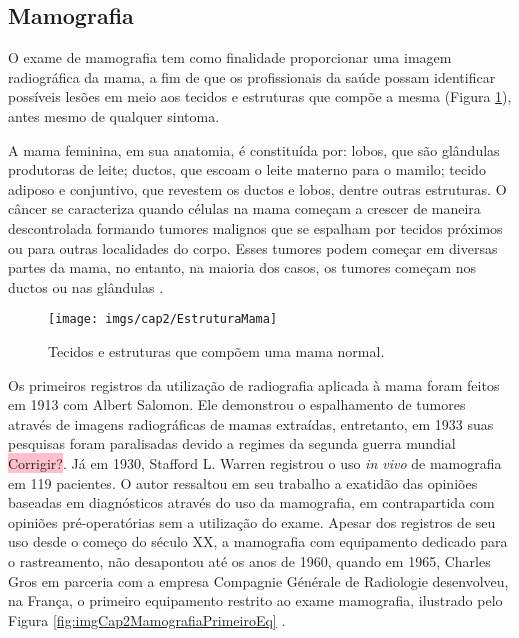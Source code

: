 \subsection{Mamografia}

O exame de mamografia tem como finalidade proporcionar uma imagem radiográfica da mama, a fim de que os profissionais da saúde possam identificar possíveis lesões em meio aos tecidos e estruturas que compõe a mesma (Figura \ref{fig:imgCap2EstruturaMama}), antes mesmo de qualquer sintoma. 

A mama feminina, em sua anatomia, é constituída por: lobos, que são glândulas produtoras de leite; ductos, que escoam o leite materno para o mamilo; tecido adiposo e conjuntivo, que revestem os ductos e lobos, dentre outras estruturas. O câncer se caracteriza quando células na mama começam a crescer de maneira descontrolada formando tumores malignos que se espalham por tecidos próximos ou para outras localidades do corpo. Esses tumores podem começar em diversas partes da mama, no entanto, na maioria dos casos, os tumores começam nos ductos ou nas glândulas \cite{americancancersociety2017}.      

\begin{figure}[H]
	\caption{Tecidos e estruturas que compõem uma mama normal.}
	\begin{center}
		\texttt{[image: imgs/cap2/EstruturaMama]}
	\end{center}
	\label{fig:imgCap2EstruturaMama}
\end{figure}

Os primeiros registros da utilização de radiografia aplicada à mama foram feitos em 1913 com Albert Salomon. Ele demonstrou o espalhamento de tumores através de imagens radiográficas de mamas extraídas, entretanto, em 1933 suas pesquisas foram paralisadas devido a regimes da segunda guerra mundial \colorbox{pink}{Corrigir?}. Já em 1930, Stafford L. Warren registrou o uso  \textit{in vivo} de mamografia em 119 pacientes. O autor ressaltou em seu trabalho a exatidão das opiniões baseadas em diagnósticos através do uso da mamografia, em contrapartida com opiniões pré-operatórias sem a utilização do exame. Apesar dos registros de seu uso desde o começo do século XX, a mamografia com equipamento dedicado para o rastreamento, não desapontou até os anos de 1960, quando em 1965, Charles Gros em parceria com a empresa Compagnie Générale de Radiologie desenvolveu, na França, o primeiro equipamento restrito ao exame mamografia, ilustrado pelo Figura \ref{fig:imgCap2MamografiaPrimeiroEq} \cite{bassett1988evolution,gold1990highlights}. 

